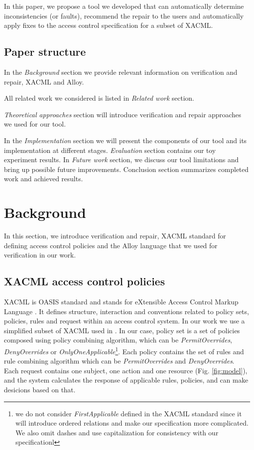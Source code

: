 \documentclass[letterpaper]{acm_proc_article-sp}
\begin{document}
In this paper, we propose a tool we developed that can automatically determine inconsistencies (or faults), recommend the repair to the users and automatically apply fixes to the access control specification for a subset of XACML.

\subsection{Paper structure}

In the \textit{Background} section we provide relevant information on verification and repair, XACML and Alloy.

All related work we considered is listed in \textit{Related work} section. 

\textit{Theoretical approaches} section will introduce verification and repair approaches we used for our tool. 

In the \textit{Implementation} section we will present the components of our tool and its implementation at different stages. 
\textit{Evaluation} section contains our toy experiment results. In \textit{Future work} section, we discuss our tool limitations and bring up possible future improvements. Conclusion section summarizes completed work and achieved results.

\section{Background}

In this section, we introduce verification and repair, XACML standard for defining access control policies and the Alloy language that we used for verification in our work.

\subsection{XACML access control policies}

XACML is OASIS standard and stands for eXtensible Access Control Markup Language \cite{oasis:xacml}. It defines structure, interaction and conventions related to policy sets, policies, rules and request within an access control system. In our work we use a simplified subset of XACML used in \cite{acp:alloy}. In our case, policy set is a set of policies composed using policy combining algorithm, which can be \textit{PermitOverrides}, \textit{DenyOverrides} or \textit{OnlyOneApplicable}\footnote[2]{we do not consider \textit{FirstApplicable} defined in the XACML standard \cite{oasis:xacml} since it will introduce ordered relations and make our specification more complicated. We also omit dashes and use capitalization for consistency with our specificationl}. Each policy contains the set of rules and rule combining algorithm which can be \textit{PermitOverrides} and \textit{DenyOverrides}. Each request contains one subject, one action and one resource (Fig. \ref{fig:model}), and the system calculates the response of applicable rules, policies, and can make desicions based on that. 
\end{document}
